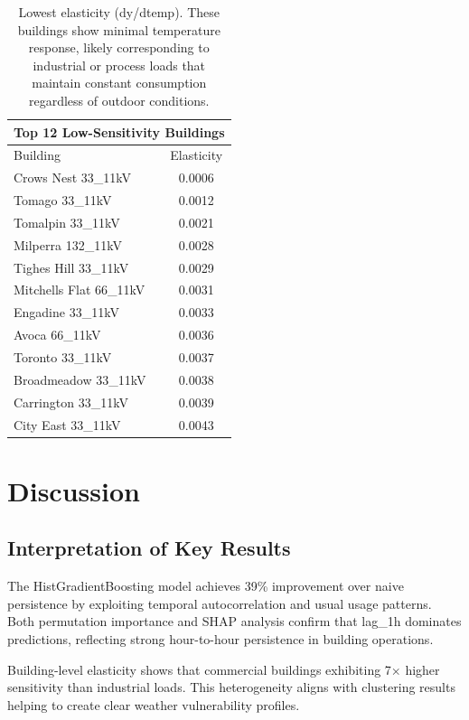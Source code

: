 \documentclass[11pt,a4paper]{article}
\begin{document}
\begin{table}[H]
  \centering
  \begin{tabular}{l c}
    \hline
    \multicolumn{2}{c}{Top 12 Low-Sensitivity Buildings} \\ \hline
    Building & Elasticity \\ \hline
    Crows Nest 33\_11kV & 0.0006 \\
    Tomago 33\_11kV & 0.0012 \\
    Tomalpin 33\_11kV & 0.0021 \\
    Milperra 132\_11kV & 0.0028 \\
    Tighes Hill 33\_11kV & 0.0029 \\
    Mitchells Flat 66\_11kV & 0.0031 \\
    Engadine 33\_11kV & 0.0033 \\
    Avoca 66\_11kV & 0.0036 \\
    Toronto 33\_11kV & 0.0037 \\
    Broadmeadow 33\_11kV & 0.0038 \\
    Carrington 33\_11kV & 0.0039 \\
    City East 33\_11kV & 0.0043 \\
    \hline
  \end{tabular}
  \caption{Lowest elasticity (dy/dtemp). These buildings show minimal temperature response, likely corresponding to industrial or process loads that maintain constant consumption regardless of outdoor conditions.}
\end{table}

\section{Discussion}

\subsection{Interpretation of Key Results}

The HistGradientBoosting model achieves 39\% improvement over naive persistence by exploiting temporal autocorrelation and usual usage patterns. Both permutation importance and SHAP analysis confirm that lag\_1h dominates predictions, reflecting strong hour-to-hour persistence in building operations.

Building-level elasticity shows that commercial buildings exhibiting 7$\times$ higher sensitivity than industrial loads. This heterogeneity aligns with clustering results helping to create clear weather vulnerability profiles.
\end{document}
